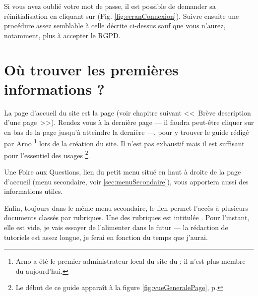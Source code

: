 \label{sec:mdpOublie}
Si vous avez oublié votre mot de passe, il est possible de demander sa réinitialisation en cliquant sur  (Fig. \ref{fig:ecranConnexion}). Suivre ensuite une procédure assez semblable à celle décrite ci-dessus sauf que vous n’aurez, notamment, plus à accepter le RGPD.


\section{Où trouver les premières informations ?}\label{page:premieresInfos}

La page d’accueil du site est la page  (voir chapitre suivant <<~Brève description d’une page~>>). Rendez vous à la dernière page --- il faudra peut-être cliquer sur   en bas de la page jusqu’à atteindre la dernière ---, pour y trouver le guide rédigé par Arno%
\footnote{Arno a été le premier administrateur local du site du \CdS; il n'est plus membre du \sel{} aujourd'hui.} 
lors de la création du site. Il n'est pas exhaustif mais il est suffisant pour l’essentiel des usages%
\footnote{Le début de ce guide apparaît à la figure \ref{fig:vueGeneralePage}, p. \pageref{fig:vueGeneralePage}}.

Une Foire aux Questions, lien  du petit menu situé en haut à droite de la page d’accueil (menu secondaire, voir \vref{sec:menuSecondaire}), vous apportera aussi des informations utiles. 

Enfin, toujours dans le même menu secondaire, le lien  permet l’accès à plusieurs documents classés par rubriques. Une  des rubriques est intitulée . Pour l’instant, elle est vide, je vais essayer de l’alimenter dans le futur --- la rédaction de tutoriels est assez longue, je ferai en fonction du temps que j'aurai.
